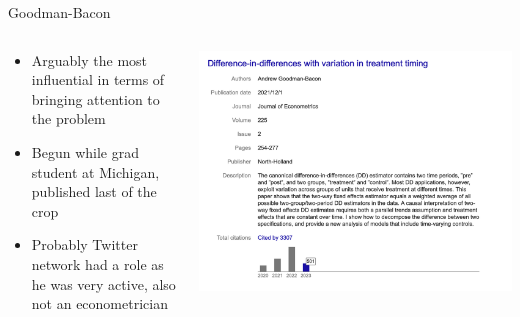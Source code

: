 \documentclass{beamer}
\begin{document}
\begin{frame}{Goodman-Bacon}
  \begin{columns}
    \begin{column}{0.5\textwidth}
      \begin{itemize}
\item Arguably the most influential in terms of bringing attention to the problem
\item Begun while grad student at Michigan, published last of the crop
\item Probably Twitter network had a role as he was very active, also not an econometrician
      \end{itemize}
    \end{column}
    \begin{column}{0.5\textwidth}
      \includegraphics[scale=0.25]{./lecture_includes/andrew_cites}
    \end{column}
  \end{columns}
\end{frame}
\end{document}
